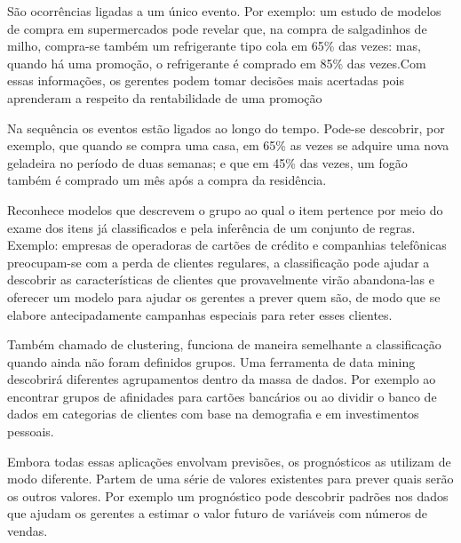 \documentclass[12pt]{article}
\begin{document}
\begin{description}[font=$\bullet$~\normalfont\scshape\color{black!50!black}]

\item[associações]  São ocorrências ligadas a um único evento. Por exemplo: um estudo de modelos de compra em supermercados pode revelar que, na compra de salgadinhos de milho, compra-se também um refrigerante tipo cola em 65\% das vezes: mas, quando há uma promoção, o refrigerante é comprado em 85\% das vezes.Com essas informações, os gerentes podem tomar decisões mais acertadas pois aprenderam a respeito da rentabilidade de uma promoção
\\
\item[sequências]  Na sequência os eventos estão ligados ao longo do tempo. Pode-se descobrir, por exemplo, que quando se compra uma casa, em 65\% as vezes se adquire uma nova geladeira no período de duas semanas; e que em 45\% das vezes, um fogão também é comprado um mês após a compra da residência.
\\
\item[classificação]Reconhece modelos que descrevem o grupo ao qual o item pertence por meio do exame dos itens já classificados e pela inferência de um conjunto de regras. Exemplo: empresas de operadoras de cartões de crédito e companhias telefônicas preocupam-se com a perda de clientes regulares, a classificação pode ajudar a descobrir as características de clientes que provavelmente virão abandona-las e oferecer um modelo para ajudar os gerentes a prever quem são, de modo que se elabore antecipadamente campanhas especiais para reter esses clientes.
\\
\item[aglomeração] Também chamado de clustering, funciona de maneira semelhante a classificação quando ainda não foram definidos grupos. Uma ferramenta de data mining descobrirá diferentes agrupamentos dentro da massa de dados. Por exemplo ao encontrar grupos de afinidades para cartões bancários ou ao dividir o banco de dados em categorias de clientes com base na demografia e em investimentos pessoais.
\\
\item[prognóstico]  Embora todas essas aplicações envolvam previsões, os prognósticos as utilizam de modo diferente. Partem de uma série de valores existentes para prever quais serão os outros valores. Por exemplo um prognóstico pode descobrir padrões nos dados que ajudam os gerentes a estimar o valor futuro de variáveis com números de vendas.

\end{description}
\end{document}
